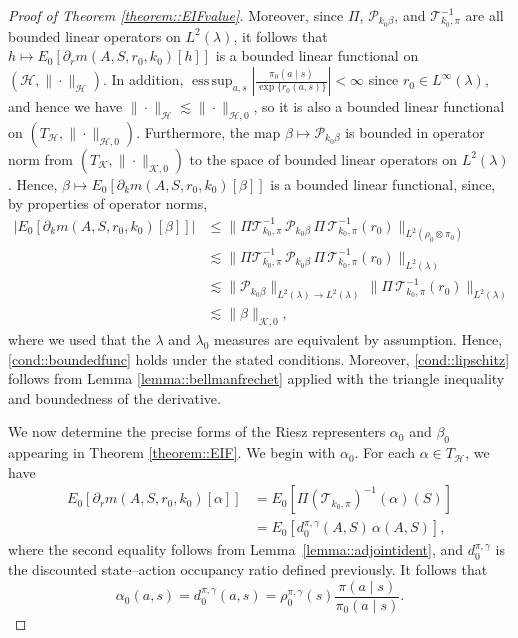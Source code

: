 \documentclass[11pt]{article}
\DeclareMathOperator*{\esssup}{ess\,sup}
\theoremstyle{plain}
\begin{document}
\begin{proof}[Proof of Theorem \ref{theorem::EIFvalue}]
Moreover, since $\Pi$, $\mathcal{P}_{k_0\beta}$, and $\mathcal{T}_{k_0,\pi}^{-1}$ are all bounded linear operators on $L^2(\lambda)$, it follows that $h \mapsto E_0[ \partial_r m(A,S,r_0,k_0)[h]]$ is a bounded linear functional on $(\mathcal{H}, \| \cdot\|_{\mathcal{H}})$. In addition, $\esssup_{a,s} \left|\frac{\pi_0(a \mid s)}{\exp \{r_0(a, s)\}}\right| < \infty$ since $r_0 \in L^\infty(\lambda)$, and hence we have $\| \cdot\|_{\mathcal{H}} \lesssim  \| \cdot\|_{\mathcal{H}, 0}$, so it is also a bounded linear functional on $(T_{\mathcal{H}}, \| \cdot\|_{\mathcal{H}, 0})$. Furthermore, the map $\beta \mapsto \mathcal{P}_{k_0\beta}$ is bounded in operator norm from $(T_{\mathcal{K}}, \| \cdot\|_{\mathcal{K}, 0})$ to the space of bounded linear operators on $L^2(\lambda)$. Hence, $\beta \mapsto   E_0[ \partial_k m(A,S,r_0,k_0)[\beta] ]$ is a bounded linear functional, since, by properties of operator norms,
\begin{align*}
    \left|E_0[ \partial_k m(A,S,r_0,k_0)[\beta] ]\right|
    & \leq \| \Pi \mathcal{T}_{k_0,\pi}^{-1}\,\mathcal{P}_{k_0\beta}\,\Pi\,\mathcal{T}_{k_0,\pi}^{-1}(r_0)\|_{L^2(\rho_0 \otimes \pi_0)} \\
    & \lesssim \| \Pi \mathcal{T}_{k_0,\pi}^{-1}\,\mathcal{P}_{k_0\beta}\,\Pi\,\mathcal{T}_{k_0,\pi}^{-1}(r_0)\|_{L^2(\lambda)} \\
    & \lesssim \|\mathcal{P}_{k_0\beta}\|_{L^2(\lambda) \rightarrow L^2(\lambda)} \,\|\Pi\,\mathcal{T}_{k_0,\pi}^{-1}(r_0)\|_{L^2(\lambda)} \\
    & \lesssim  \|\beta\|_{\mathcal{K}, 0},
\end{align*}
where we used that the $\lambda$ and $\lambda_0$ measures are equivalent by assumption.
Hence, \ref{cond::boundedfunc} holds under the stated conditions. Moreover, \ref{cond::lipschitz} follows from Lemma \ref{lemma::bellmanfrechet} applied with the triangle inequality and boundedness of the derivative.

We now determine the precise forms of the Riesz representers $\alpha_0$ and $\beta_0$ appearing in Theorem \ref{theorem::EIF}. We begin with $\alpha_0$. For each $\alpha \in T_{\mathcal{H}}$, we have
\begin{align*}
     E_0[ \partial_r m(A,S,r_0,k_0)[\alpha]] 
     &= E_0\!\left[\Pi (\mathcal{T}_{k_0,\pi})^{-1}(\alpha)(S)\right] \\
     &= E_0[d_0^{\pi,\gamma}(A,S)\,\alpha(A,S)],
\end{align*}
where the second equality follows from Lemma~\ref{lemma::adjointident}, and $d_0^{\pi,\gamma}$ is the discounted state–action occupancy ratio defined previously.
It follows that
$$\alpha_0(a,s) = d_0^{\pi,\gamma}(a,s) = \rho_0^{\pi,\gamma}(s) \frac{\pi(a \mid s)}{\pi_0(a\mid s)}.$$


\end{proof}
\end{document}
